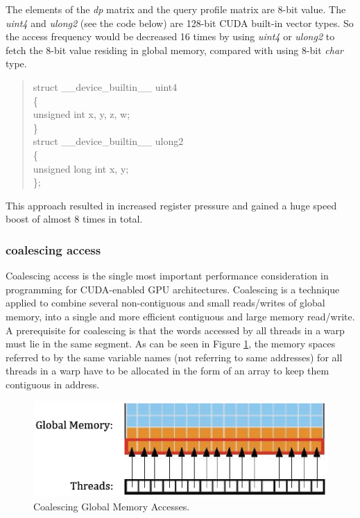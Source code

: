 The elements of the \emph{dp} matrix and the query profile matrix are 8-bit value.  The \emph{uint4} and \emph{ulong2} (see the code below) are 128-bit CUDA built-in vector types. So the access frequency would be decreased 16 times by using \emph{uint4} or \emph{ulong2} to fetch the 8-bit value residing in global memory, compared with using 8-bit \emph{char} type.

\begin{quote}
\selectfont
struct \_\_device\_builtin\_\_ uint4\\
\{\\
   unsigned int x, y, z, w;\\
\}\\
struct \_\_device\_builtin\_\_ ulong2\\
\{\\
    unsigned long int x, y;\\
\};\\
\end{quote}

This approach resulted in increased register pressure and gained a huge speed boost of almost 8 times in total.

\subsubsection*{coalescing access}

Coalescing access is the single most important performance consideration in programming for CUDA-enabled GPU architectures. Coalescing is a technique applied to combine several non-contiguous and small reads/writes of global memory, into a single and more efficient contiguous and large memory read/write. A prerequisite for coalescing is that the words accessed by all threads in a warp must lie in the same segment. As can be seen in Figure \ref{fig:coalescing}, the memory spaces referred to by the same variable names (not referring to same addresses) for all threads in a warp have to be allocated in the form of an array to keep them contiguous in address.

\begin{figure}[!htb]
	\centering
	\includegraphics[totalheight=0.115\textheight]{Figures/coalesce.png}
	\caption{\selectfont Coalescing Global Memory Accesses\citep{Waters}.}
	\label{fig:coalescing}
\end{figure}

